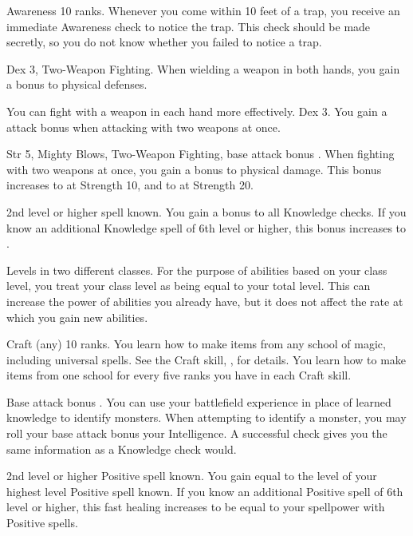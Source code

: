 \featpre Awareness 10 ranks.
\featben Whenever you come within 10 feet of a trap, you receive an immediate Awareness check to notice the trap.
This check should be made secretly, so you do not know whether you failed to notice a trap.

\featpres Dex 3, Two-Weapon Fighting.
\featben When wielding a weapon in both hands, you gain a  bonus to physical defenses.

You can fight with a weapon in each hand more effectively.
\featpre Dex 3.
\featben You gain a  attack bonus when attacking with two weapons at once.

\featpres Str 5, Mighty Blows, Two-Weapon Fighting, base attack bonus .
\featben When fighting with two weapons at once, you gain a  bonus to physical damage.
This bonus increases to  at Strength 10, and to  at Strength 20.

\featpre 2nd level or higher  spell known.
\featben You gain a  bonus to all Knowledge checks.
If you know an additional Knowledge spell of 6th level or higher, this bonus increases to .

\featpre Levels in two different classes.
\featben For the purpose of abilities based on your class level, you treat your class level as being equal to your total level.
This can increase the power of abilities you already have, but it does not affect the rate at which you gain new abilities.

\featpre Craft (any) 10 ranks.
\featben You learn how to make items from any school of magic, including universal spells.
See the Craft skill, , for details.
You learn how to make items from one school for every five ranks you have in each Craft skill.

\featpre Base attack bonus .
\featben You can use your battlefield experience in place of learned knowledge to identify monsters.
When attempting to identify a monster, you may roll your base attack bonus \add your Intelligence.
A successful check gives you the same information as a Knowledge check would.

\featpre 2nd level or higher Positive spell known.
\featben You gain  equal to the level of your highest level Positive spell known.
If you know an additional Positive spell of 6th level or higher, this fast healing increases to be equal to your spellpower with Positive spells.

